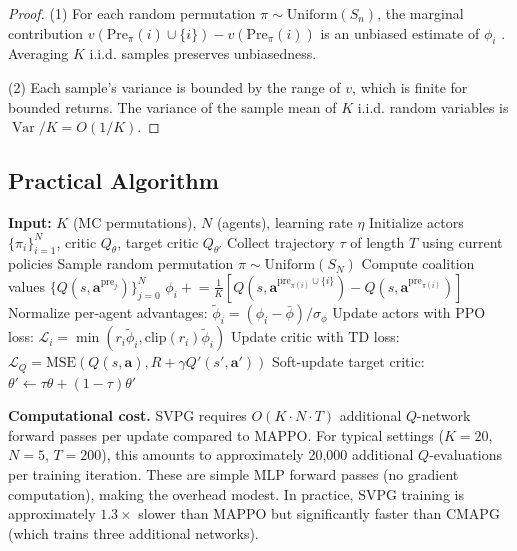 \documentclass[11pt,a4paper]{article}
\DeclareMathOperator*{\Var}{\mathrm{Var}}
\begin{document}
\begin{proof}
(1) For each random permutation $\pi \sim \text{Uniform}(S_n)$, the marginal contribution $v(\text{Pre}_\pi(i) \cup \{i\}) - v(\text{Pre}_\pi(i))$ is an unbiased estimate of $\phi_i$ \cite{shapley1953value}. Averaging $K$ i.i.d. samples preserves unbiasedness.

(2) Each sample's variance is bounded by the range of $v$, which is finite for bounded returns. The variance of the sample mean of $K$ i.i.d. random variables is $\Var/K = O(1/K)$.
\end{proof}

\subsection{Practical Algorithm}

\begin{algorithm}[H]
\caption{Shapley Value Policy Gradient (SVPG)}
\label{alg:svpg}
\begin{algorithmic}[1]
\STATE \textbf{Input:} $K$ (MC permutations), $N$ (agents), learning rate $\eta$
\STATE Initialize actors $\{\pi_i\}_{i=1}^N$, critic $Q_\theta$, target critic $Q_{\theta'}$
    \STATE Collect trajectory $\tau$ of length $T$ using current policies
            \STATE Sample random permutation $\pi \sim \text{Uniform}(S_N)$
            \STATE Compute coalition values $\{Q(s, \mathbf{a}^{\text{pre}_j})\}_{j=0}^N$
                \STATE $\phi_i \mathrel{+}= \frac{1}{K}[Q(s, \mathbf{a}^{\text{pre}_{\pi(i)} \cup \{i\}}) - Q(s, \mathbf{a}^{\text{pre}_{\pi(i)}})]$
            \ENDFOR
        \ENDFOR
    \ENDFOR
    \STATE Normalize per-agent advantages: $\tilde{\phi}_i = (\phi_i - \bar{\phi}) / \sigma_{\phi}$
    \STATE Update actors with PPO loss: $\mathcal{L}_i = \min(r_i \tilde{\phi}_i, \text{clip}(r_i)\tilde{\phi}_i)$
    \STATE Update critic with TD loss: $\mathcal{L}_Q = \text{MSE}(Q(s,\mathbf{a}), R + \gamma Q'(s',\mathbf{a}'))$
    \STATE Soft-update target critic: $\theta' \leftarrow \tau \theta + (1-\tau) \theta'$
\ENDFOR
\end{algorithmic}
\end{algorithm}

\textbf{Computational cost.} SVPG requires $O(K \cdot N \cdot T)$ additional $Q$-network forward passes per update compared to MAPPO. For typical settings ($K=20$, $N=5$, $T=200$), this amounts to approximately 20,000 additional $Q$-evaluations per training iteration. These are simple MLP forward passes (no gradient computation), making the overhead modest. In practice, SVPG training is approximately $1.3\times$ slower than MAPPO but significantly faster than CMAPG (which trains three additional networks).
\end{document}
